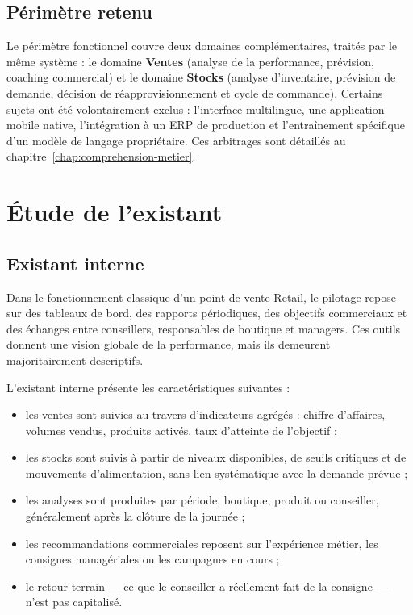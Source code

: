 \subsection{Périmètre retenu}

Le périmètre fonctionnel couvre deux domaines complémentaires, traités par le même système : le domaine \textbf{Ventes} (analyse de la performance, prévision, coaching commercial) et le domaine \textbf{Stocks} (analyse d'inventaire, prévision de demande, décision de réapprovisionnement et cycle de commande). Certains sujets ont été volontairement exclus : l'interface multilingue, une application mobile native, l'intégration à un ERP de production et l'entraînement spécifique d'un modèle de langage propriétaire. Ces arbitrages sont détaillés au chapitre~\ref{chap:comprehension-metier}.

\section{Étude de l'existant}

\subsection{Existant interne}

Dans le fonctionnement classique d'un point de vente Retail, le pilotage repose sur des tableaux de bord, des rapports périodiques, des objectifs commerciaux et des échanges entre conseillers, responsables de boutique et managers. Ces outils donnent une vision globale de la performance, mais ils demeurent majoritairement descriptifs.

L'existant interne présente les caractéristiques suivantes :

\begin{itemize}[label=--]
    \item les ventes sont suivies au travers d'indicateurs agrégés : chiffre d'affaires, volumes vendus, produits activés, taux d'atteinte de l'objectif ;
    \item les stocks sont suivis à partir de niveaux disponibles, de seuils critiques et de mouvements d'alimentation, sans lien systématique avec la demande prévue ;
    \item les analyses sont produites par période, boutique, produit ou conseiller, généralement après la clôture de la journée ;
    \item les recommandations commerciales reposent sur l'expérience métier, les consignes managériales ou les campagnes en cours ;
    \item le retour terrain — ce que le conseiller a réellement fait de la consigne — n'est pas capitalisé.
\end{itemize}

